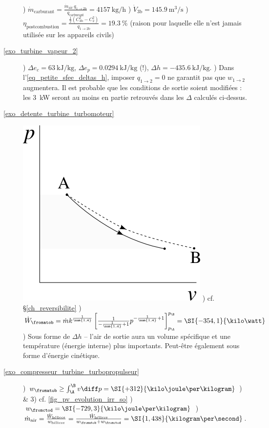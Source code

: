 \begin{description}
					) $\dot{m}_\text{carburant} = \frac{\dot{m}_\text{air} \ q_{1\to 2\text{b}}}{q_\text{carburant}} = \SI[per-mode=symbol]{4157}{\kilogram\per\hour}$
					) $\dot{V}_{3\text{b}} = \SI{145,9}{\metre\cubed\per\second} $
					) $\eta_\text{postcombustion} = \frac{\frac{1}{2}\left(C_{3\text{b}}^2 - C_2^2\right)}{q_{1\to 2\text{b}}} =  \SI{19,3}{\percent}$ (raison pour laquelle elle n’est jamais utilisée sur les appareils civils)
	\item [\ref{exo_turbine_vapeur_2}]
					) $\Delta e_c = \SI{+63}{\kilo\joule\per\kilogram}$, $\Delta e_p = \SI{+0,0294}{\kilo\joule\per\kilogram}$ (!), $\Delta h = \SI{-435,6}{\kilo\joule\per\kilogram}$.
					) Dans l’\cref{eq_petite_sfee_deltas_h}, imposer $q_{1 \to 2} = 0$ ne garantit pas que $w_{1 \to 2}$ augmentera. Il est probable que les conditions de sortie soient modifiées : les \SI{3}{\kilo\watt} seront au moins en partie retrouvés dans les $\Delta$ calculés ci-dessus.
	\item [\ref{exo_detente_turbine_turbomoteur}]
					\includegraphics[width=\solutiondiagramwidth]{images/exo_pv_2.png}
					) cf. \S\ref{ch_reversibilite}
					) $\dot{W}_\fromatob = \dot m k^{\frac{1}{\num{1,4}}} \left[\frac{1}{-\frac{1}{\num{1,4}} +1} p^{-\frac{1}{\num{1,4}} +1}\right]_{p_\A}^{p_\B} = \SI{-354,1}{\kilo\watt}$
					) Sous forme de $\Delta h$ -- l’air de sortie aura un volume spécifique et une température (énergie interne) plus importants. Peut-être également sous forme d’énergie cinétique.
	\item [\ref{exo_compresseur_turbine_turbopropulseur}] 
					) $w_\fromatob \geq \int_\A^\B v \diff p = \SI{+312}{\kilo\joule\per\kilogram}$
					) \& 3) cf. \cref{fig_pv_evolution_irr_so}
					) $w_\fromctod = \SI{-729,3}{\kilo\joule\per\kilogram}$
					) $\dot{m}_\text{air} = \frac{\dot{W}_\text{hélices}}{w_\text{hélices}} = \frac{\dot{W}_\text{hélices}}{w_\fromatob + w_\fromctod} = \SI{1,438}{\kilogram\per\second}$.
\end{description}
